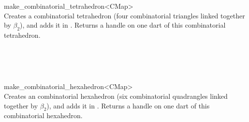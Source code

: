 \begin{ccRefFunction}{make_combinatorial_tetrahedron<CMap>}
\\

{Creates a combinatorial tetrahedron (four combinatorial triangles linked 
  together by $\beta_2$), and adds it in . 
  Returns a handle on one dart of this combinatorial tetrahedron.
}

\ccSeeAlso
{}\\
\\
\\
\end{ccRefFunction}
\begin{ccRefFunction}{make_combinatorial_hexahedron<CMap>}
\\

{Creates an combinatorial hexahedron (six combinatorial quadrangles linked 
  together by $\beta_2$), and adds it in . 
  Returns a handle on one dart of this combinatorial hexahedron.
}

\ccSeeAlso
{}\\
\\
\\
\end{ccRefFunction}

\ccRefPageEnd
